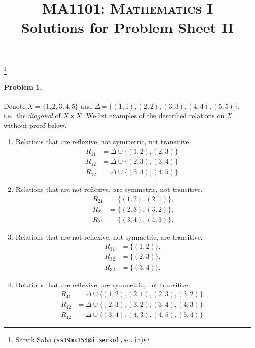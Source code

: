\documentclass[10pt]{article}
\title{
    \textsc{
        \large
        MA1101: Mathematics I
    }
    \\\vspace{0.2em}
    \textbf{
        \huge
        Solutions for Problem Sheet II
    }
    \vspace{-1em}
}
\author{}
\date{}
\newcommand\blfootnote[1]{%
    \begingroup
    \renewcommand\thefootnote{}\footnote{#1}%
    \addtocounter{footnote}{-1}%
    \endgroup
}
\begin{document}
    \maketitle
    \blfootnote{
        Satvik Saha (\texttt{ss19ms154@iiserkol.ac.in})
    }



    \paragraph{Problem 1.}
    Denote $X = \{1, 2, 3, 4, 5\}$ and $\Delta = \{(1, 1), (2, 2), (3, 3), (4,
    4), (5, 5)\}$, i.e.\ the \emph{diagonal} of $X\times X$.
    We list examples of the described relations on $X$ without proof below.

    \begin{enumerate}
        \item Relations that are reflexive, not symmetric, not transitive.
        \begin{align*}
            R_{11} &= \Delta \cup \{(1, 2), (2, 3)\}, \\
            R_{12} &= \Delta \cup \{(2, 3), (3, 4)\}, \\
            R_{12} &= \Delta \cup \{(3, 4), (4, 5)\}.
        \end{align*}

        \item Relations that are not reflexive, are symmetric, not transitive.
        \begin{align*}
            R_{21} &= \{(1, 2), (2, 1)\}, \\
            R_{22} &= \{(2, 3), (3, 2)\}, \\
            R_{22} &= \{(3, 4), (4, 3)\}.
        \end{align*}

        \item Relations that are not reflexive, not symmetric, are transitive.
        \begin{align*}
            R_{31} &= \{(1, 2)\}, \\
            R_{32} &= \{(2, 3)\}, \\
            R_{32} &= \{(3, 4)\}.
        \end{align*}

        \item Relations that are reflexive, are symmetric, not transitive.
        \begin{align*}
            R_{41} &= \Delta \cup \{(1, 2), (2, 1), (2, 3), (3, 2)\}, \\
            R_{42} &= \Delta \cup \{(2, 3), (3, 2), (3, 4), (4, 3)\}, \\
            R_{42} &= \Delta \cup \{(3, 4), (4, 3), (4, 5), (5, 4)\}.
        \end{align*}


\end{enumerate}
\end{document}
